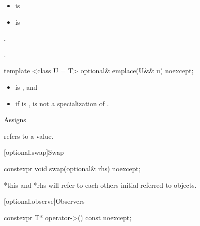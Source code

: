   \begin{itemdescr}
    \pnum
    \mandates
    \begin{itemize}
    \item {} is 
    \item {} is 
    \end{itemize}

    \pnum
    \ensures
    .

    \pnum
    \returns
    .

  \end{itemdescr}


  \begin{itemdecl}
    template <class U = T> optional& emplace(U&& u) noexcept;
  \end{itemdecl}

  \begin{itemdescr}
    \constraints
    \begin{itemize}
    \item {} is , and
    \item if  is \cv{} ,
       is not a specialization of .
    \end{itemize}
    \pnum
    \effects
    Assigns  

    \pnum
    \ensures
     refers to a value.

  \end{itemdescr}

  [optional.swap]{Swap}

  \begin{itemdecl}
    constexpr void swap(optional& rhs) noexcept;
  \end{itemdecl}

  \begin{itemdescr}

    \pnum
    \effects
    *this and *rhs will refer to each others initial referred to objects.

  \end{itemdescr}


  [optional.observe]{Observers}

  \begin{itemdecl}
    constexpr T* operator->() const noexcept;
  \end{itemdecl}

